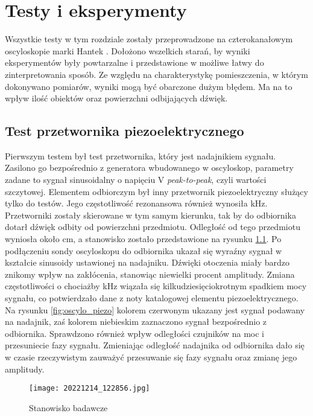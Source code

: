 \chapter[Testy i eksperymenty]{Testy i eksperymenty}
\label{chapter:testy}
Wszystkie testy w tym rozdziale zostały przeprowadzone na czterokanałowym oscyloskopie marki Hantek \cite{hantek}. 
Dołożono wszelkich starań, by wyniki eksperymentów były powtarzalne i przedstawione w możliwe łatwy do zinterpretowania sposób.
Ze względu na charakterystykę pomieszczenia, w którym dokonywano pomiarów, wyniki mogą być obarczone dużym błędem. 
Ma na to wpływ ilość obiektów oraz powierzchni odbijających dźwięk.


\section{Test przetwornika piezoelektrycznego}
Pierwszym testem był test przetwornika, który jest nadajnikiem sygnału. Zasilono go bezpośrednio z generatora wbudowanego w oscyloskop, 
parametry zadane to sygnał sinusoidalny o napięciu \unit[5]{V} \textit{peak-to-peak}, czyli wartości szczytowej.
Elementem odbiorczym był inny przetwornik piezoelektryczny służący tylko do testów. Jego częstotliwość rezonansowa również wynosiła \unit[40]{kHz}.
Przetworniki zostały skierowane w tym samym kierunku, tak by do odbiornika dotarł dźwięk odbity od powierzchni przedmiotu. 
Odległość od tego przedmiotu wyniosła około \unit[25]{cm}, a stanowisko zostało przedstawione na rysunku \ref{fig:oscylo_piezo_photo}.
Po podłączeniu sondy oscyloskopu do odbiornika ukazał się wyraźny sygnał w kształcie sinusoidy ustawionej na nadajniku.
Dźwięki otoczenia miały bardzo znikomy wpływ na zakłócenia, stanowiąc niewielki procent amplitudy. 
Zmiana częstotliwości o chociażby \unit[1]{kHz} wiązała się kilkudziesięciokrotnym spadkiem mocy sygnału, co potwierdzało dane z noty katalogowej elementu piezoelektrycznego.
Na rysunku \ref{fig:oscylo_piezo} kolorem czerwonym ukazany jest sygnał podawany na nadajnik, zaś kolorem niebieskim zaznaczono sygnał bezpośrednio z odbiornika.
Sprawdzono również wpływ odległości czujników na moc i przesuniecie fazy sygnału.
Zmieniając odległość nadajnika od odbiornika dało się w czasie rzeczywistym zauważyć przesuwanie się fazy sygnału oraz zmianę jego amplitudy. 

\begin{figure}[!ht]
    \centering
    \texttt{[image: 20221214\_122856.jpg]}
    \caption{Stanowisko badawcze}
    \label{fig:oscylo_piezo_photo}
\end{figure}

